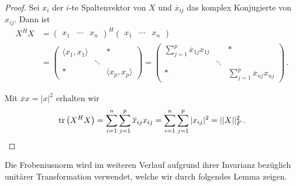 \documentclass[../Bachelor_LennartKoliwer.tex]{subfiles}
\begin{document}
\begin{proof}
	Sei $x_i$ der $i$-te Spaltenvektor von $X$ und $\overline{x}_{ij}$ das komplex Konjugierte von $x_{ij}$. Dann ist
	\begin{align*}
		X^HX & =
		\begin{pmatrix}
			x_1 & \cdots & x_n 
		\end{pmatrix}^H
		\begin{pmatrix}
			x_1 & \cdots & x_n
		\end{pmatrix} \\
		     & = \begin{pmatrix}
			         \langle x_{1}, x_{1}\rangle &        & *                                             \\
			                                                      & \ddots &                                               \\
			         *                                            &        & \langle x_{p}, x_{p}\rangle
		         \end{pmatrix}
		= \begin{pmatrix}
			  \displaystyle\sum_{j=1}^{p}\overline{x}_{1j} x_{1j} &        & *                                                    \\
			                                                      & \ddots &                                                      \\
			  *                                                   &        & \displaystyle\sum_{j=1}^{p} \overline{x}_{nj} x_{nj}
		  \end{pmatrix}\,.
	\end{align*}

	Mit \(\overline{x}x = |x|^2\) erhalten wir
	\begin{align}
		\operatorname{tr} \left(X^HX\right) = \sum_{i=1}^{n}\sum_{j=1}^{p} \overline{x}_{ij} x_{ij} = \sum_{i=1}^{n}\sum_{j=1}^{p} |x_{ij}|^2 = ||X||_F^2 \,. \label{eq:traceFrob}
	\end{align}
\end{proof}


Die Frobeniusnorm wird im weiteren Verlauf aufgrund ihrer Invarianz bezüglich unitärer Transformation verwendet, welche wir durch folgendes Lemma zeigen.
\end{document}

